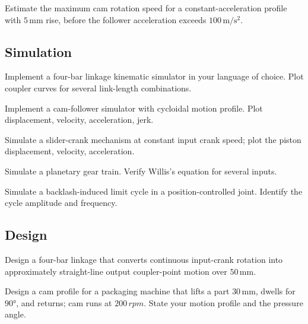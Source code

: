\begin{exercise}
Estimate the maximum cam rotation speed for a constant-acceleration profile with $5\,\si{\milli\meter}$ rise, before the follower acceleration exceeds $100\,\si{\meter\per\second\squared}$.
\end{exercise}

\subsection*{Simulation}

\begin{exercise}
Implement a four-bar linkage kinematic simulator in your language of choice. Plot coupler curves for several link-length combinations.
\end{exercise}

\begin{exercise}
Implement a cam-follower simulator with cycloidal motion profile. Plot displacement, velocity, acceleration, jerk.
\end{exercise}

\begin{exercise}
Simulate a slider-crank mechanism at constant input crank speed; plot the piston displacement, velocity, acceleration.
\end{exercise}

\begin{exercise}
Simulate a planetary gear train. Verify Willis's equation for several inputs.
\end{exercise}

\begin{exercise}
Simulate a backlash-induced limit cycle in a position-controlled joint. Identify the cycle amplitude and frequency.
\end{exercise}

\subsection*{Design}

\begin{exercise}
Design a four-bar linkage that converts continuous input-crank rotation into approximately straight-line output coupler-point motion over $50\,\si{\milli\meter}$.
\end{exercise}

\begin{exercise}
Design a cam profile for a packaging machine that lifts a part $30\,\si{\milli\meter}$, dwells for $90°$, and returns; cam runs at $200\,\si{rpm}$. State your motion profile and the pressure angle.
\end{exercise}

